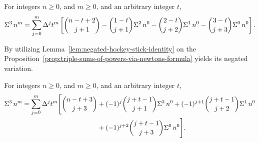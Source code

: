 \begin{proposition}
  \label{prop:triple-sums-of-powers-via-newtons-formula}
  For integers $n\geq 0$, and $m\geq 0$, and an arbitrary integer $t$,
  \begin{align*}
    \Sigma^{3}\,{n}^{m}
    = \sum_{j=0}^{m} \Delta^{j} t^m
    \left[ \binom{n-t+2}{j+1}
      - \binom{1-t}{j+1} \Sigma^{2}\,{n}^{0}
      - \binom{2-t}{j+2} \Sigma^{1}\,{n}^{0}
      - \binom{3-t}{j+3} \Sigma^{0}\,{n}^{0}
    \right].
  \end{align*}
\end{proposition}

By utilizing Lemma~\eqref{lem:negated-hockey-stick-identity}
on the
Proposition~\eqref{prop:triple-sums-of-powers-via-newtons-formula}
yields its negated variation.
\begin{proposition}
  For integers $n\geq 0$, and $m\geq 0$, and an arbitrary integer $t$,
  \begin{align*}
    \Sigma^{3}\,{n}^{m} = \sum_{j=0}^{m} \Delta^{j} t^m
    \Bigg[ \binom{n-t+3}{j+3}
      &+ (-1)^{j} \binom{j+t-1}{j+1} \Sigma^{2}\,{n}^{0}
      + (-1)^{j+1} \binom{j+t-1}{j+2} \Sigma^{1}\,{n}^{0} \\
      &+ (-1)^{j+2} \binom{j+t-1}{j+3} \Sigma^{0}\,{n}^{0}
    \Bigg].
  \end{align*}
\end{proposition}

